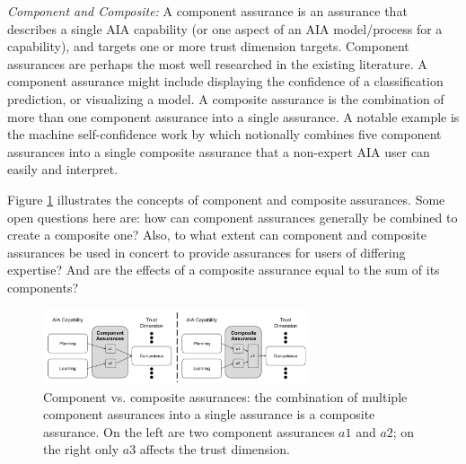 \emph{Component and Composite:}
A component assurance is an assurance that describes a single AIA capability (or one aspect of an AIA model/process for a capability), and targets one or more trust dimension targets.  Component assurances are perhaps the most well researched in the existing literature. A component assurance might include displaying the confidence of a classification prediction, or visualizing a model. A composite assurance is the combination of more than one component assurance into a single assurance. 
A notable example is the machine self-confidence work by \citet{Aitken2016-cv} which notionally combines five component assurances into a single composite assurance that a non-expert AIA user can easily and interpret. 

Figure \ref{fig:assurance_mapping} illustrates the concepts of component and composite assurances. Some open questions here are: how can component assurances generally be combined to create a composite one? Also, to what extent can component and composite assurances be used in concert to provide assurances for users of differing expertise? And are the effects of a composite assurance equal to the sum of its components?

\begin{figure}[!htbp]
    \centering
    \includegraphics[width=0.7\textwidth]{Figures/Assurance_component_composite.pdf}
    \caption{
    Component vs. composite assurances: the combination of multiple component assurances into a single assurance is a composite assurance. On the left are two component assurances $a1$ and $a2$; on the right only $a3$ affects the trust dimension.}
    \label{fig:assurance_mapping}
\end{figure}
